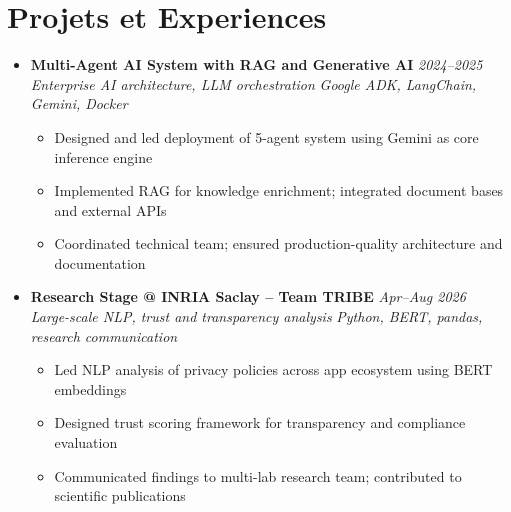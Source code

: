 \documentclass[a4paper,11pt]{article}
\begin{document}
\section{Projets et Experiences}
\begin{itemize}[leftmargin=*, label={-}]

\item \textbf{Multi-Agent AI System with RAG and Generative AI} \hfill \textit{2024--2025} \\
\textit{Enterprise AI architecture, LLM orchestration} \hfill \textit{Google ADK, LangChain, Gemini, Docker}
\vspace{-2pt}
    \begin{itemize}[leftmargin=0.4cm, nosep, label=\tiny$\bullet$]
        \item \small{Designed and led deployment of 5-agent system using Gemini as core inference engine}
        \item \small{Implemented RAG for knowledge enrichment; integrated document bases and external APIs}
        \item \small{Coordinated technical team; ensured production-quality architecture and documentation}
    \end{itemize}
\vspace{3pt}

\item \textbf{Research Stage @ INRIA Saclay -- Team TRIBE} \hfill \textit{Apr--Aug 2026} \\
\textit{Large-scale NLP, trust and transparency analysis} \hfill \textit{Python, BERT, pandas, research communication}
\vspace{-2pt}
    \begin{itemize}[leftmargin=0.4cm, nosep, label=\tiny$\bullet$]
        \item \small{Led NLP analysis of privacy policies across app ecosystem using BERT embeddings}
        \item \small{Designed trust scoring framework for transparency and compliance evaluation}
        \item \small{Communicated findings to multi-lab research team; contributed to scientific publications}
    \end{itemize}
\vspace{3pt}


\end{itemize}
\end{document}
